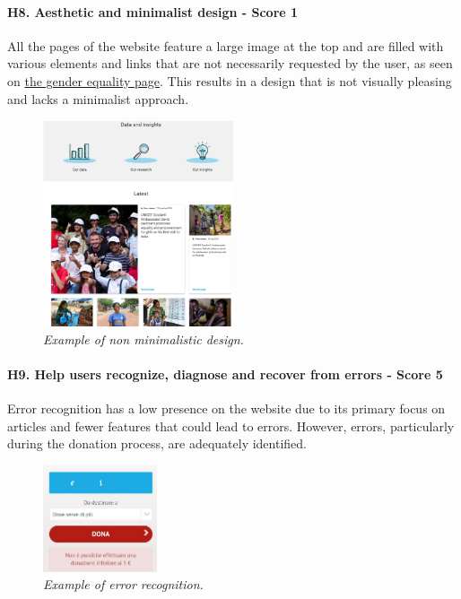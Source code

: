 \paragraph{H8. Aesthetic and minimalist design - Score 1}	All the pages of the website feature a large image at the top and are filled with various elements and links that are not necessarily requested by the user, as seen on \href{https://www.unicef.org/gender-equality}{the gender equality page}. This results in a design that is not visually pleasing and lacks a minimalist approach.
\begin{figure}[!h]
	\begin{center}
		\includegraphics[width=0.5\textwidth]{Picture5.jpg}
		\captionsetup{font=small}
		\caption{\textit{Example of non minimalistic design.}}
	\end{center}
\end{figure}
\newline
\paragraph{H9. Help users recognize, diagnose and recover from errors - Score 5}	Error recognition has a low presence on the website due to its primary focus on articles and fewer features that could lead to errors. However, errors, particularly during the donation process, are adequately identified.
\begin{figure}[!h]
	\begin{center}
		\includegraphics[width=0.3\textwidth]{Picture6.jpg}
		\captionsetup{font=small}
		\caption{\textit{Example of error recognition.}}
	\end{center}
\end{figure}
\newline
